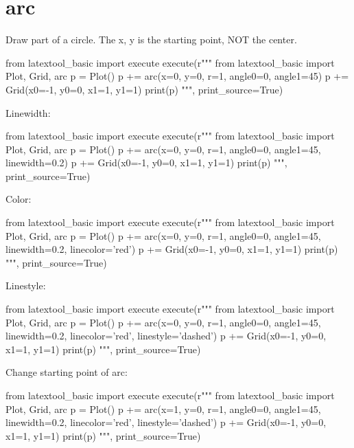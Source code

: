 \section{arc}

Draw part of a circle.
The x, y is the starting point, NOT the center.
{\small
\begin{python}
from latextool_basic import execute
execute(r"""
from latextool_basic import Plot, Grid, arc
p = Plot()
p += arc(x=0, y=0, r=1, angle0=0, angle1=45)
p += Grid(x0=-1, y0=0, x1=1, y1=1)
print(p)
""", print_source=True)
\end{python}
}





Linewidth:
{\small
\begin{python}
from latextool_basic import execute
execute(r"""
from latextool_basic import Plot, Grid, arc
p = Plot()
p += arc(x=0, y=0, r=1, angle0=0, angle1=45, linewidth=0.2)
p += Grid(x0=-1, y0=0, x1=1, y1=1)
print(p)
""", print_source=True)
\end{python}
}




Color:
{\small
\begin{python}
from latextool_basic import execute
execute(r"""
from latextool_basic import Plot, Grid, arc
p = Plot()
p += arc(x=0, y=0, r=1, angle0=0, angle1=45, 
         linewidth=0.2, linecolor='red')
p += Grid(x0=-1, y0=0, x1=1, y1=1)
print(p)
""", print_source=True)
\end{python}
}



Linestyle:
{\small
\begin{python}
from latextool_basic import execute
execute(r"""
from latextool_basic import Plot, Grid, arc
p = Plot()
p += arc(x=0, y=0, r=1, angle0=0, angle1=45, 
        linewidth=0.2, linecolor='red', linestyle='dashed')
p += Grid(x0=-1, y0=0, x1=1, y1=1)
print(p)
""", print_source=True)
\end{python}
}




Change starting point of arc:
{\small
\begin{python}
from latextool_basic import execute
execute(r"""
from latextool_basic import Plot, Grid, arc
p = Plot()
p += arc(x=1, y=0, r=1, angle0=0, angle1=45, 
        linewidth=0.2, linecolor='red', linestyle='dashed')
p += Grid(x0=-1, y0=0, x1=1, y1=1)
print(p)
""", print_source=True)
\end{python}
}




